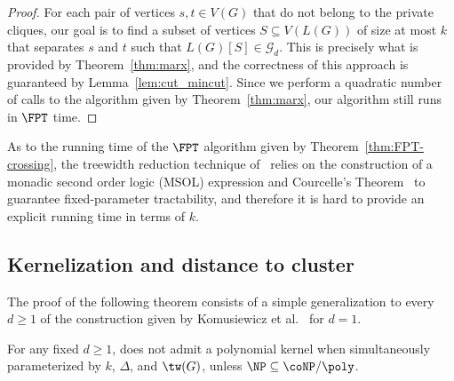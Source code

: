 \begin{proof}
    For each pair of vertices $s,t \in V(G)$ that do not belong to the private cliques, our goal is to find a subset of vertices $S \subseteq V(L(G))$ of size at most $k$ that separates $s$ and $t$ such that $L(G)[S] \in \mathcal{G}_d$.
    This is precisely what is provided by Theorem~\ref{thm:marx}, and the correctness of this approach is guaranteed by Lemma~\ref{lem:cut_mincut}.
    Since we perform a quadratic number of calls to the  algorithm given by Theorem~\ref{thm:marx}, our algorithm still runs in $\FPT$ time.
\end{proof}

As to the running time of the $\FPT$ algorithm given by Theorem~\ref{thm:FPT-crossing}, the treewidth reduction technique of~\cite{marx_treewidth_reduction} relies on the construction of a monadic second order logic (MSOL) expression and Courcelle's Theorem~\cite{courcelle_theorem} to guarantee fixed-parameter tractability, and therefore it is hard to provide an explicit running time in terms of $k$.


\subsection{Kernelization and distance to cluster}
\label{sec:kernelization}

The proof of the following theorem consists of a simple generalization to every $d \geq 1$ of the construction given by Komusiewicz et al.~\cite{matching_cut_ipec}  for $d=1$.

\begin{theorem}\label{thm:no-kernel}
    For any fixed $d \geq 1$,  does not admit a polynomial kernel when simultaneously parameterized by $k$, $\Delta$, and $\tw(G)$, unless $\NP \subseteq \coNP/\poly$.
\end{theorem}

